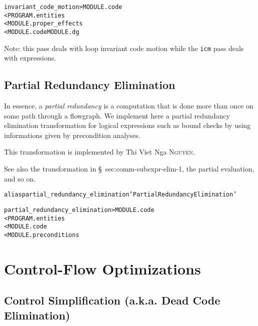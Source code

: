 \documentclass[a4paper]{report}
\newenvironment{PipsMake}{\begin{alltt}}{\end{alltt}}
\newenvironment{PipsPass}[1]{\label{pass:#1}}{}
\begin{document}
\begin{PipsMake}
invariant_code_motion             > MODULE.code
        < PROGRAM.entities
        < MODULE.proper_effects
        < MODULE.code MODULE.dg
\end{PipsMake}

Note: this pass deals with loop invariant code motion while the
\verb/icm/ pass deals with expressions.


\subsection{Partial Redundancy Elimination}
\label{subsection-partial_redundancy_elimination}


\begin{PipsPass}{partial_redundancy_elimination}

In essence, a {\it partial redundancy} \cite{Muc97} is a computation that is
done more than once on some path through a flowgraph. We implement here a
partial redundancy elimination transformation for logical
expressions such as bound checks by using informations given by
precondition analyses.

This transformation is implemented by Thi Viet Nga \textsc{Nguyen}.
\end{PipsPass}

See also the transformation in \S~{sec:comm-subexpr-elim-1}, the partial
evaluation, and so on.

\begin{PipsMake}
alias partial_redundancy_elimination 'Partial Redundancy Elimination'

partial_redundancy_elimination             > MODULE.code
        < PROGRAM.entities
        < MODULE.code
        < MODULE.preconditions
\end{PipsMake}




\section{Control-Flow Optimizations}


\subsection{Control Simplification (a.k.a. Dead Code Elimination)}
\label{sec:dead-code-elimination}
\end{document}
